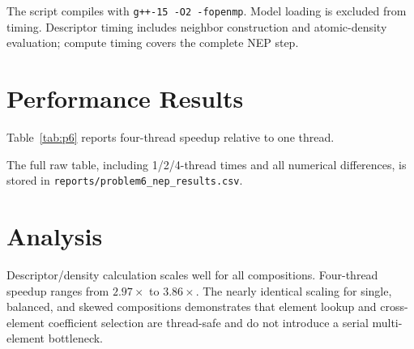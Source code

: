 \documentclass[11pt]{article}
\begin{document}
The script compiles with \texttt{g++-15 -O2 -fopenmp}. Model loading is
excluded from timing. Descriptor timing includes neighbor construction and
atomic-density evaluation; compute timing covers the complete NEP step.

\section{Performance Results}
Table~\ref{tab:p6} reports four-thread speedup relative to one thread.

\begin{table}[ht]
\centering
\small
{}
\caption{Problem 6 NEP descriptor and full-compute scaling.}
\label{tab:p6}
\end{table}

The full raw table, including 1/2/4-thread times and all numerical differences,
is stored in \texttt{reports/problem6\_nep\_results.csv}.

\section{Analysis}
Descriptor/density calculation scales well for all compositions. Four-thread
speedup ranges from $2.97\times$ to $3.86\times$. The nearly identical scaling
for single, balanced, and skewed compositions demonstrates that element lookup
and cross-element coefficient selection are thread-safe and do not introduce a
serial multi-element bottleneck.
\end{document}
